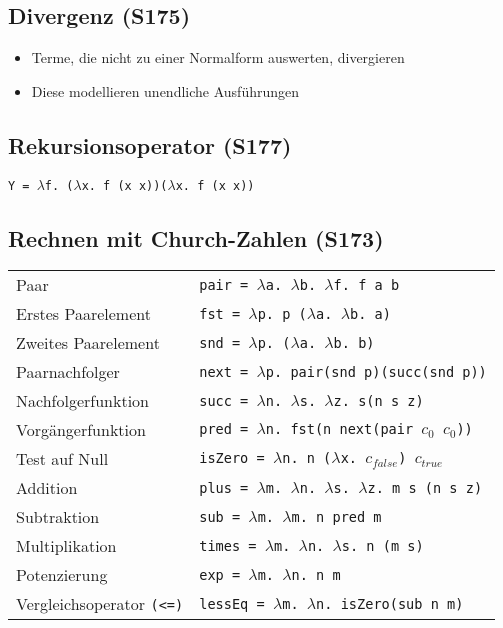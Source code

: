 \subsection{Divergenz (S175)}
\begin{itemize}
	\item Terme, die nicht zu einer Normalform auswerten, divergieren
	\item Diese modellieren unendliche Ausführungen
\end{itemize}


\subsection{Rekursionsoperator (S177)}
\texttt{Y = \(\lambda\)f. (\(\lambda\)x. f (x x))(\(\lambda\)x. f (x x))}


\subsection{Rechnen mit Church-Zahlen (S173)}
\begin{table}[H]
\begin{tabularx}{\textwidth}{l|X}
	Paar & \texttt{pair = \(\lambda\)a. \(\lambda\)b. \(\lambda\)f. f a b} \\
	Erstes Paarelement & \texttt{fst = \(\lambda\)p. p (\(\lambda\)a. \(\lambda\)b. a)} \\
	Zweites Paarelement & \texttt{snd = \(\lambda\)p. (\(\lambda\)a. \(\lambda\)b. b)} \\
	Paarnachfolger & \texttt{next = \(\lambda\)p. pair(snd p)(succ(snd p))} \\
	Nachfolgerfunktion & \texttt{succ = \(\lambda\)n. \(\lambda\)s. \(\lambda\)z. s(n s z)} \\
	Vorgängerfunktion & \texttt{pred = \(\lambda\)n. fst(n next(pair \(c_0\) \(c_0\)))} \\
	Test auf Null & \texttt{isZero = \(\lambda\)n. n (\(\lambda\)x. \(c_{false}\)) \(c_{true}\)} \\
	Addition & \texttt{plus = \(\lambda\)m. \(\lambda\)n. \(\lambda\)s. \(\lambda\)z. m s (n s z)} \\
	Subtraktion & \texttt{sub = \(\lambda\)m. \(\lambda\)m. n pred m} \\
	Multiplikation & \texttt{times = \(\lambda\)m. \(\lambda\)n. \(\lambda\)s. n (m s)} \\
	Potenzierung & \texttt{exp = \(\lambda\)m. \(\lambda\)n. n m} \\
	Vergleichsoperator \texttt{(<=)} & \texttt{lessEq = \(\lambda\)m. \(\lambda\)n. isZero(sub n m)} \\
\end{tabularx}
\end{table}



